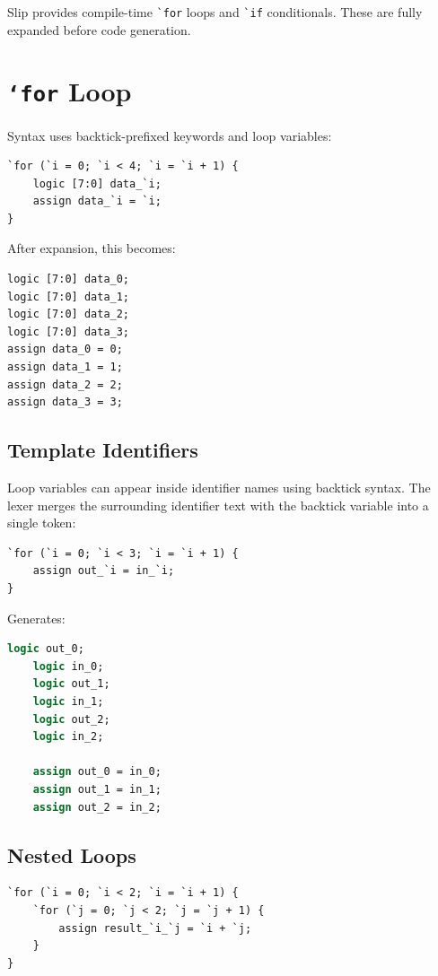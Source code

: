 \documentclass[lang=en,11pt]{elegantbook}
\newcommand{\code}[1]{\texttt{#1}}
\newcommand{\slipinline}[1]{\lstinline[language=Slip]|#1|}
\begin{document}
Slip provides compile-time \slipinline{`for} loops and \slipinline{`if} conditionals. These are fully expanded before code generation.

\section{\texorpdfstring{\code{`for}}{`for} Loop}

Syntax uses backtick-prefixed keywords and loop variables:

\begin{lstlisting}[language=Slip]
`for (`i = 0; `i < 4; `i = `i + 1) {
    logic [7:0] data_`i;
    assign data_`i = `i;
}
\end{lstlisting}

After expansion, this becomes:

\begin{lstlisting}[language=Slip]
logic [7:0] data_0;
logic [7:0] data_1;
logic [7:0] data_2;
logic [7:0] data_3;
assign data_0 = 0;
assign data_1 = 1;
assign data_2 = 2;
assign data_3 = 3;
\end{lstlisting}

\subsection{Template Identifiers}

Loop variables can appear inside identifier names using backtick syntax. The lexer merges the surrounding identifier text with the backtick variable into a single token:

\begin{lstlisting}[language=Slip]
`for (`i = 0; `i < 3; `i = `i + 1) {
    assign out_`i = in_`i;
}
\end{lstlisting}

Generates:

\begin{lstlisting}[language=SystemVerilog]
    logic out_0;
    logic in_0;
    logic out_1;
    logic in_1;
    logic out_2;
    logic in_2;

    assign out_0 = in_0;
    assign out_1 = in_1;
    assign out_2 = in_2;
\end{lstlisting}

\subsection{Nested Loops}

\begin{lstlisting}[language=Slip]
`for (`i = 0; `i < 2; `i = `i + 1) {
    `for (`j = 0; `j < 2; `j = `j + 1) {
        assign result_`i_`j = `i + `j;
    }
}
\end{lstlisting}
\end{document}
